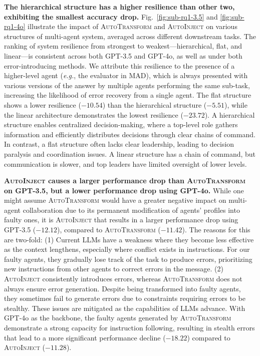 \documentclass{article}
\theoremstyle{plain}
\theoremstyle{definition}
\theoremstyle{remark}
\newcommand{\eg}{\textit{e.g.}}
\begin{document}
\textbf{The hierarchical structure has a higher resilience than other two, exhibiting the smallest accuracy drop.}
Fig.~\ref{fig:sub-rq1-3.5} and \ref{fig:sub-rq1-4o} illustrate the impact of \textsc{AutoTransform} and \textsc{AutoInject} on various structures of multi-agent system, averaged across different downstream tasks.
The ranking of system resilience from strongest to weakest—hierarchical, flat, and linear—is consistent across both GPT-3.5 and GPT-4o, as well as under both error-introducing methods.
We attribute this resilience to the presence of a higher-level agent (\eg, the evaluator in MAD), which is always presented with various versions of the answer by multiple agents performing the same sub-task, increasing the likelihood of error recovery from a single agent.
The flat structure shows a lower resilience ($-10.54$) than the hierarchical structure ($-5.51$), while the linear architecture demonstrates the lowest resilience ($-23.72$).
A hierarchical structure enables centralized decision-making, where a top-level role gathers information and efficiently distributes decisions through clear chains of command.
In contrast, a flat structure often lacks clear leadership, leading to decision paralysis and coordination issues.
A linear structure has a chain of command, but communication is slower, and top leaders have limited oversight of lower levels.

\textbf{\textsc{AutoInject} causes a larger performance drop than \textsc{AutoTransform} on GPT-3.5, but a lower performance drop using GPT-4o.}
While one might assume \textsc{AutoTransform} would have a greater negative impact on multi-agent collaboration due to its permanent modification of agents' profiles into faulty ones, it is \textsc{AutoInject} that results in a larger performance drop using GPT-3.5 ($-12.12$), compared to \textsc{AutoTransform} ($-11.42$).
The reasons for this are two-fold:
(1) Current LLMs have a weakness where they become less effective as the context lengthens, especially where conflict exists in instructions.
For our faulty agents, they gradually lose track of the task to produce errors, prioritizing new instructions from other agents to correct errors in the message.
(2) \textsc{AutoInject} consistently introduces errors, whereas \textsc{AutoTransform} does not always ensure error generation.
Despite being transformed into faulty agents, they sometimes fail to generate errors due to constraints requiring errors to be stealthy.
These issues are mitigated as the capabilities of LLMs advance.
With GPT-4o as the backbone, the faulty agents generated by \textsc{AutoTransform} demonstrate a strong capacity for instruction following, resulting in stealth errors that lead to a more significant performance decline ($-18.22$) compared to \textsc{AutoInject} ($-11.28$).
\end{document}
